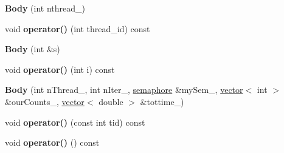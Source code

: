 \begin{DoxyCompactItemize}
\item 
\hypertarget{classBody_af112fc6adb27eef0d0e23cc65bad8def}{}{\bfseries Body} (int nthread\+\_\+)\label{classBody_af112fc6adb27eef0d0e23cc65bad8def}

\item 
\hypertarget{classBody_ae2dddd118d20de4cc53c7c248255f40a}{}void {\bfseries operator()} (int thread\+\_\+id) const \label{classBody_ae2dddd118d20de4cc53c7c248255f40a}

\item 
\hypertarget{classBody_acc0e55d05710ccde9f6f850d0e37bff3}{}{\bfseries Body} (int \&s)\label{classBody_acc0e55d05710ccde9f6f850d0e37bff3}

\item 
\hypertarget{classBody_a22be913df6242acf0a578280602914fb}{}void {\bfseries operator()} (int i) const \label{classBody_a22be913df6242acf0a578280602914fb}

\item 
\hypertarget{classBody_abe96a4145cf565f547e6ef8692bc59a5}{}{\bfseries Body} (int n\+Thread\+\_\+, int n\+Iter\+\_\+, \hyperlink{classtbb_1_1internal_1_1semaphore}{semaphore} \&my\+Sem\+\_\+, \hyperlink{structvector}{vector}$<$ int $>$ \&our\+Counts\+\_\+, \hyperlink{structvector}{vector}$<$ double $>$ \&tottime\+\_\+)\label{classBody_abe96a4145cf565f547e6ef8692bc59a5}

\item 
\hypertarget{classBody_a0f477e0cc696e81414bb690cbe7ff2c2}{}void {\bfseries operator()} (const int tid) const \label{classBody_a0f477e0cc696e81414bb690cbe7ff2c2}

\item 
\hypertarget{classBody_aacd831f5b7d15309e52c8c3068d9b569}{}void {\bfseries operator()} () const \label{classBody_aacd831f5b7d15309e52c8c3068d9b569}

\end{DoxyCompactItemize}
